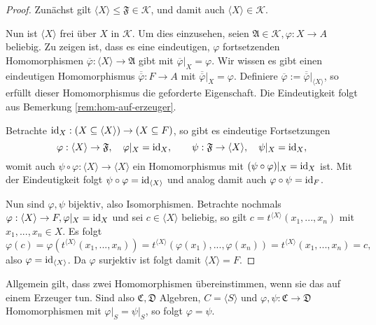\begin{proof}
    Zunächst gilt $ \langle X \rangle \leq \mathfrak{F} \in \mathcal{K} $, und damit auch $ \langle X \rangle \in \mathcal{K} $.

    Nun ist $ \langle X \rangle $ frei über $X$ in $\mathcal{K}$. Um dies einzusehen, seien $\mathfrak{A} \in \mathcal{K}, \varphi : X \to A$ beliebig. Zu zeigen ist, dass es eine eindeutigen, $\varphi$ fortsetzenden Homomorphismen $\overline{\varphi} : \langle X \rangle \to \mathfrak{A}$ gibt mit $\overline{\varphi} \vert_X = \varphi$. Wir wissen es gibt einen eindeutigen Homomorphismus $\overline{\overline{\varphi}} : F \to A$ mit $\overline{\overline{\varphi}} \vert_X = \varphi$. Definiere $\overline{\varphi} := \overline{\overline{\varphi}} \vert_{\langle X \rangle}$, so erfüllt dieser Homomorphismus die geforderte Eigenschaft. Die Eindeutigkeit folgt aus Bemerkung \ref{rem:hom-auf-erzeuger}.

    Betrachte $\operatorname{id}_X : (X \subseteq \langle X \rangle) \to (X \subseteq F)$, so gibt es eindeutige Fortsetzungen
    $$ \varphi : \langle X \rangle \to \mathfrak{F}, \quad \varphi \vert_X = \operatorname{id}_X, \quad\quad \psi : \mathfrak{F} \to \langle X \rangle, \quad \psi \vert_X = \operatorname{id}_X, $$
    womit auch $\psi \circ \varphi : \langle X \rangle \to \langle X \rangle$ ein Homomorphismus mit $(\psi \circ \varphi) \vert_X = \operatorname{id}_X$ ist. Mit der Eindeutigkeit folgt $\psi \circ \varphi = \operatorname{id}_{\langle X \rangle}$ und analog damit auch $\varphi \circ \psi = \operatorname{id}_F$.

    Nun sind $\varphi, \psi$ bijektiv, also Isomorphismen. Betrachte nochmals $\varphi : \langle X \rangle \to F, \varphi \vert_X = \operatorname{id}_X$ und sei $c \in \langle X \rangle$ beliebig, so gilt $c = t^{\langle X \rangle}(x_1, ..., x_n)$ mit $x_1, ..., x_n \in X$. Es folgt
    $$ \varphi(c) = \varphi(t^{\langle X \rangle}(x_1, ..., x_n)) = t^{\langle X \rangle}(\varphi(x_1), ..., \varphi(x_n)) = t^{\langle X \rangle}(x_1, ..., x_n) = c, $$
    also $\varphi = \operatorname{id}_{\langle X \rangle}$. Da $\varphi$ surjektiv ist folgt damit $\langle X \rangle = F$.
\end{proof}

\begin{remark} \label{rem:hom-auf-erzeuger}
    Allgemein gilt, dass zwei Homomorphismen übereinstimmen, wenn sie das auf einem Erzeuger tun. Sind also $\mathfrak{C}, \mathfrak{D}$ Algebren, $C = \langle S \rangle$ und $\varphi, \psi : \mathfrak{C} \to \mathfrak{D}$ Homomorphismen mit $\varphi \vert_S = \psi \vert_S$, so folgt $\varphi = \psi$.
\end{remark}

